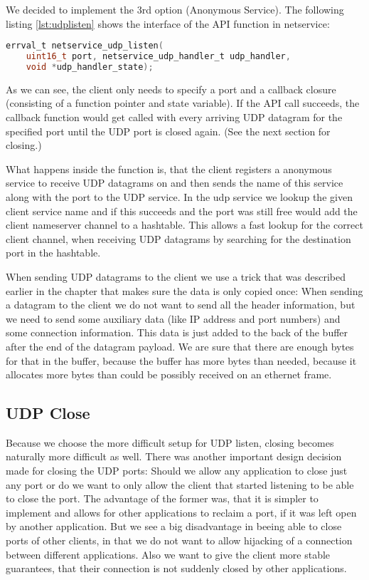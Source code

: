 We decided to implement the 3rd option (Anonymous Service).
The following listing \ref{lst:udplisten} shows the interface of the API function in netservice:

\begin{lstlisting}[language=c, caption=Interface for UDP listen, label=lst:udplisten]
errval_t netservice_udp_listen(
    uint16_t port, netservice_udp_handler_t udp_handler,
    void *udp_handler_state);
\end{lstlisting}

As we can see, the client only needs to specify a port and a callback closure (consisting of a function pointer and state variable). If the API call succeeds, the callback function would get called with every arriving UDP datagram for the specified port until the UDP port is closed again. (See the next section for closing.)

What happens inside the function is, that the client registers a anonymous service to receive UDP datagrams on and then sends the name of this service along with the port to the UDP service. In the udp service we lookup the given client service name and if this succeeds and the port was still free would add the client nameserver channel to a hashtable. This allows a fast lookup for the correct client channel, when receiving UDP datagrams by searching for the destination port in the hashtable.

When sending UDP datagrams to the client we use a trick that was described earlier in the chapter that makes sure the data is only copied once: When sending a datagram to the client we do not want to send all the header information, but we need to send some auxiliary data (like IP address and port numbers) and some connection information. This data is just added to the back of the buffer after the end of the datagram payload. We are sure that there are enough bytes for that in the buffer, because the buffer has more bytes than needed, because it allocates more bytes than could be possibly received on an ethernet frame.

\subsection{UDP Close}
Because we choose the more difficult setup for UDP listen, closing becomes naturally more difficult as well. There was another important design decision made for closing the UDP ports: Should we allow any application to close just any port or do we want to only allow the client that started listening to be able to close the port. The advantage of the former was, that it is simpler to implement and allows for other applications to reclaim a port, if it was left open by another application. But we see a big disadvantage in beeing able to close ports of other clients, in that we do not want to allow hijacking of a connection between different applications. Also we want to give the client more stable guarantees, that their connection is not suddenly closed by other applications.

